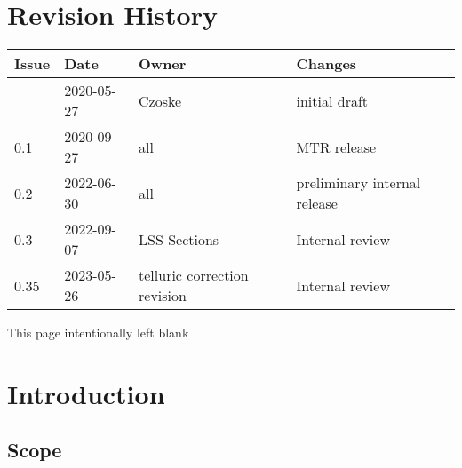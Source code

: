 \documentclass[11pt,oneside,a4paper]{article}
\begin{document}





\clearpage
\pagestyle{fancy}

\section*{Revision History}

\renewcommand{\arraystretch}{1.2}
\begin{tabularx}{\textwidth}{|l|l|l|X|}
  \hline
  \rowcolor{rd1}
  \textbf{Issue} & \textbf{Date} & \textbf{Owner} & \textbf{Changes} \\
  \hline
                 & 2020-05-27    & Czoske         & initial draft    \\
  0.1            & 2020-09-27    & all            & MTR release      \\
  0.2            & 2022-06-30    & all            & preliminary internal release      \\
  0.3            & 2022-09-07    & LSS Sections   & Internal review \\
  0.35           & 2023-05-26    & telluric correction revision   & Internal review \\
  \hline
\end{tabularx}


\newpage
\tableofcontents
\clearpage
\listoffigures
\clearpage
\listoftables

\clearpage
\phantom{a}
\vfill
\begin{center}
  This page intentionally left blank
\end{center}
\vfill
\clearpage



\section{Introduction}
\label{sec:intro}

\subsection{Scope}
\end{document}
